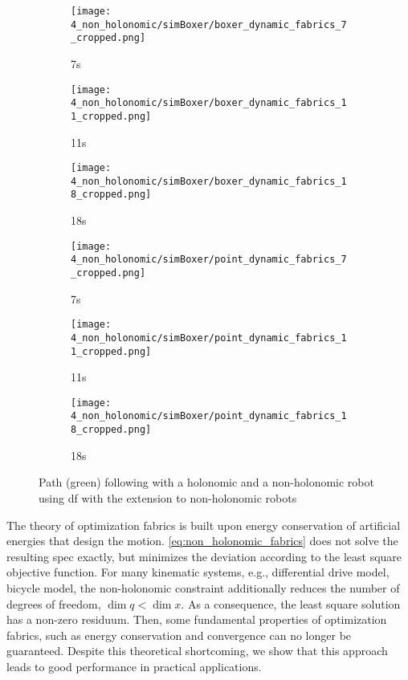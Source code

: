 \begin{figure}
  \centering
  \begin{subfigure}{0.3\linewidth}
    \centering
    \texttt{[image: 4\_non\_holonomic/simBoxer/boxer\_dynamic\_fabrics\_7\_cropped.png]}
    \caption{7s}
  \end{subfigure}%
  \begin{subfigure}{0.3\linewidth}
    \centering
    \texttt{[image: 4\_non\_holonomic/simBoxer/boxer\_dynamic\_fabrics\_11\_cropped.png]}
    \caption{11s}
  \end{subfigure}%
  \begin{subfigure}{0.3\linewidth}
    \centering
    \texttt{[image: 4\_non\_holonomic/simBoxer/boxer\_dynamic\_fabrics\_18\_cropped.png]}
    \caption{18s}
  \end{subfigure}
  \begin{subfigure}{0.3\linewidth}
    \centering
    \texttt{[image: 4\_non\_holonomic/simBoxer/point\_dynamic\_fabrics\_7\_cropped.png]}
    \caption{7s}
  \end{subfigure}%
  \begin{subfigure}{0.3\linewidth}
    \centering
    \texttt{[image: 4\_non\_holonomic/simBoxer/point\_dynamic\_fabrics\_11\_cropped.png]}
    \caption{11s}
  \end{subfigure}%
  \begin{subfigure}{0.3\linewidth}
    \centering
    \texttt{[image: 4\_non\_holonomic/simBoxer/point\_dynamic\_fabrics\_18\_cropped.png]}
    \caption{18s}
  \end{subfigure}%
  \caption{Path (green) following with a holonomic and a non-holonomic robot using \ac{df} with the extension
  to non-holonomic robots}
  \label{fig:non_holonomic_trajectory}
\end{figure}


The theory of optimization fabrics is built upon energy conservation of artificial energies
that design the motion. \cref{eq:non_holonomic_fabrics} does not solve the
resulting spec exactly, but minimizes the deviation according to the least square objective function.
For many kinematic systems, e.g., differential drive model, bicycle model, the
non-holonomic constraint additionally reduces the number of degrees of freedom, 
$\dim{q} < \dim{x}$. As a consequence, the least square solution has a non-zero residuum.
Then, some fundamental properties of optimization fabrics, such as energy
conservation and convergence can no longer be guaranteed. Despite this theoretical
shortcoming, we show that this approach leads to good performance in practical applications. 










